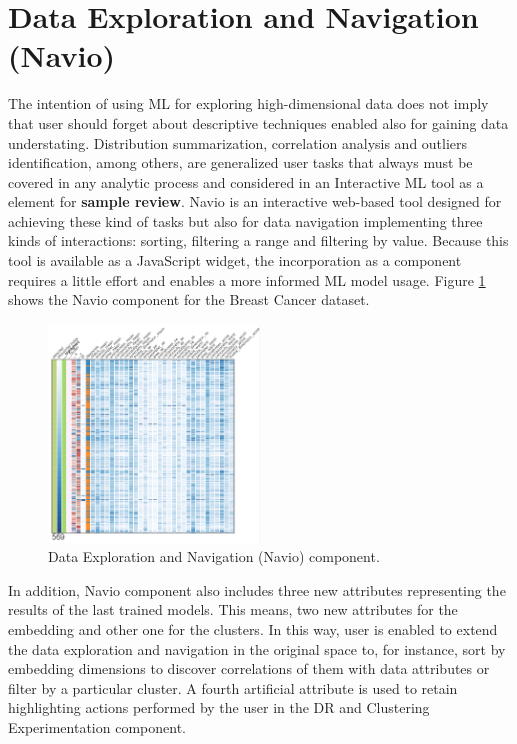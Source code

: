 \section{Data Exploration and Navigation (Navio)}
\label{section3.2}

The intention of using ML for exploring high-dimensional data does not imply that user should forget about descriptive techniques enabled also for gaining data understating. Distribution summarization, correlation analysis and outliers identification, among others, are generalized user tasks that always must be covered in any analytic process and considered in an Interactive ML tool as a element for \textbf{sample review}. Navio \cite{Guerra-Gomez2018Navio:Datasets} is an interactive web-based tool designed for achieving these kind of tasks but also for data navigation implementing three kinds of interactions: sorting, filtering a range and filtering by value. Because this tool is available as a JavaScript widget, the incorporation as a component requires a little effort and enables a more informed ML model usage. Figure \ref{fig:navio-component} shows the Navio component for the Breast Cancer dataset. 

\begin{figure}[ht]
 \centering
 \includegraphics[width=0.5\textwidth]{navio.png}
 \caption{Data Exploration and Navigation (Navio) component.}
 \label{fig:navio-component}
\end{figure}

In addition, Navio component also includes three new attributes representing the results of the last trained models. This means, two new attributes for the embedding and other one for the clusters. In this way, user is enabled to extend the data exploration and navigation in the original space to, for instance, sort by embedding dimensions to discover correlations of them with data attributes or filter by a particular cluster. A fourth artificial attribute is used to retain highlighting actions performed by the user in the DR and Clustering Experimentation component.

